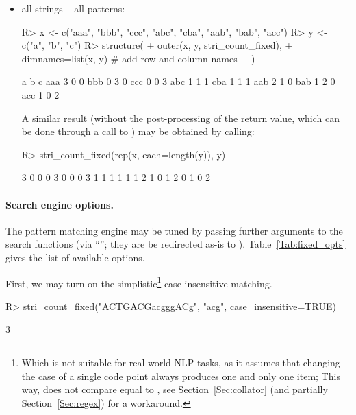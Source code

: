 \documentclass[nojss]{jss}
\begin{document}
\begin{itemize}
\item all strings -- all patterns:

\begin{Schunk}
\begin{Sinput}
R> x <- c("aaa", "bbb", "ccc", "abc", "cba", "aab", "bab", "acc")
R> y <- c("a", "b", "c")
R> structure(
+      outer(x, y, stri_count_fixed),
+      dimnames=list(x, y)  # add row and column names
+  )
\end{Sinput}
\begin{Soutput}
    a b c
aaa 3 0 0
bbb 0 3 0
ccc 0 0 3
abc 1 1 1
cba 1 1 1
aab 2 1 0
bab 1 2 0
acc 1 0 2
\end{Soutput}
\end{Schunk}

A similar result (without the post-processing of the return value,
which can be done through a call to )
may be obtained by calling:

\begin{Schunk}
\begin{Sinput}
R> stri_count_fixed(rep(x, each=length(y)), y)
\end{Sinput}
\begin{Soutput}
 [1] 3 0 0 0 3 0 0 0 3 1 1 1 1 1 1 2 1 0 1 2 0 1 0 2
\end{Soutput}
\end{Schunk}


\end{itemize}



\paragraph{Search engine options.}
The pattern matching engine may be tuned  by passing
further arguments to the search functions (via ``'';
they are be redirected as-is to ).
Table~\ref{Tab:fixed_opts} gives the list of available options.





First, we may turn on the simplistic\footnote{Which is not suitable
for real-world NLP tasks, as it assumes
that changing the case of a single code point always produces one and only
one item;
This way,  does not compare equal to ,
see Section~\ref{Sec:collator} (and partially Section~\ref{Sec:regex}) for a workaround.}
case-insensitive matching.


\begin{Schunk}
\begin{Sinput}
R> stri_count_fixed("ACTGACGacgggACg", "acg", case_insensitive=TRUE)
\end{Sinput}
\begin{Soutput}
[1] 3
\end{Soutput}
\end{Schunk}
\end{document}
